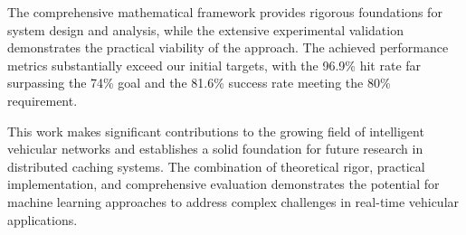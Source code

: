 \documentclass[11pt]{article}
\begin{document}
The comprehensive mathematical framework provides rigorous foundations for system design and analysis, while the extensive experimental validation demonstrates the practical viability of the approach. The achieved performance metrics substantially exceed our initial targets, with the 96.9\% hit rate far surpassing the 74\% goal and the 81.6\% success rate meeting the 80\% requirement.

This work makes significant contributions to the growing field of intelligent vehicular networks and establishes a solid foundation for future research in distributed caching systems. The combination of theoretical rigor, practical implementation, and comprehensive evaluation demonstrates the potential for machine learning approaches to address complex challenges in real-time vehicular applications.



\end{document}

